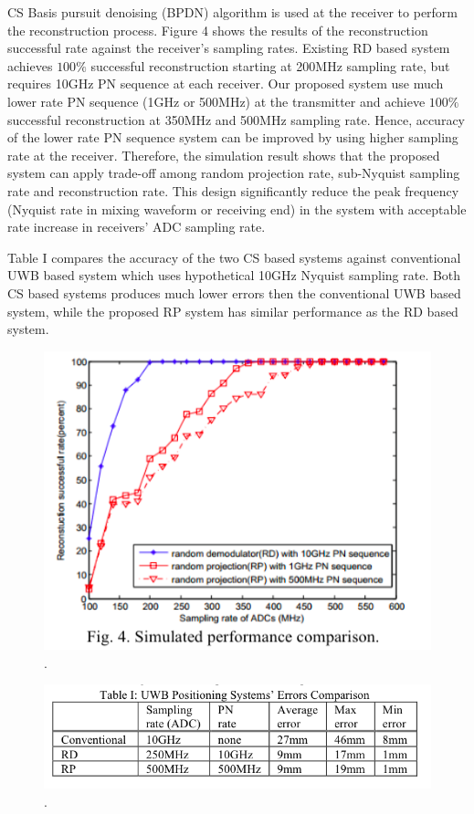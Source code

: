CS Basis pursuit denoising (BPDN) algorithm is used at the receiver to perform the reconstruction process. Figure 4 shows the results of the reconstruction successful rate against the receiver’s sampling rates. Existing RD based system achieves $100\%$ successful reconstruction starting at 200MHz sampling rate, but requires 10GHz PN sequence at each receiver. Our proposed system use much lower rate PN sequence (1GHz or 500MHz) at the transmitter and achieve $100\%$ successful reconstruction at 350MHz and 500MHz sampling rate. Hence, accuracy of the lower rate PN sequence system can be improved by using higher sampling rate at the receiver. Therefore, the simulation result shows that the proposed system can apply trade-off among random projection rate, sub-Nyquist sampling rate and reconstruction rate. This design significantly reduce the peak frequency (Nyquist rate in mixing waveform or receiving end) in the system with acceptable rate increase in receivers' ADC sampling rate. 

Table I compares the accuracy of the two CS based systems against conventional UWB based system which uses hypothetical 10GHz Nyquist sampling rate. Both CS based systems produces much lower errors then the conventional UWB based system, while the proposed RP system has similar performance as the RD based system. 

\begin{figure}[!t]
\centering
\includegraphics[width=0.5\columnwidth]{figs/res-pub.png}
\DeclareGraphicsExtensions.
\label{res-pub}
\end{figure}
\begin{figure}[!t]
\centering
\includegraphics[width=0.75\columnwidth]{figs/res-pub-table.png}
\DeclareGraphicsExtensions.
\label{res-temp}
\end{figure}

